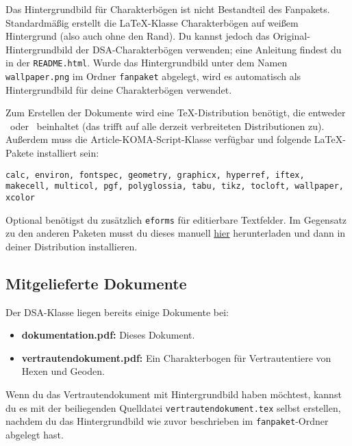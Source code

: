 \documentclass{dsa}
\begin{document}
  Das Hintergrundbild für Charakterbögen ist nicht Bestandteil des Fanpakets.
  Standardmäßig erstellt die \LaTeX-Klasse Charakterbögen auf weißem Hintergrund
  (also auch ohne den Rand). Du kannst jedoch das Original-Hintergrundbild der
  DSA-Charakterbögen verwenden; eine Anleitung findest du in der \texttt{README.html}.
  Wurde das Hintergrundbild unter dem Namen \texttt{wallpaper.png} im Ordner 
  \texttt{fanpaket} abgelegt, wird es automatisch als Hintergrundbild für deine
  Charakterbögen verwendet.
  
  Zum Erstellen der Dokumente wird eine TeX-Distribution benötigt, die entweder
  \XeLaTeX \ oder \LuaLaTeX \ beinhaltet (das trifft auf alle derzeit verbreiteten
  Distributionen zu). Außerdem muss die Article-KOMA-Script-Klasse verfügbar und
  folgende \LaTeX-Pakete installiert sein:

  \vspace{-12pt}
  \begin{flushleft}
    \texttt{calc, environ, fontspec, geometry, graphicx, hyperref, iftex, makecell,
    multicol, pgf, polyglossia, tabu, tikz, tocloft, wallpaper, xcolor}
  \end{flushleft}
  \vspace{-12pt}

  Optional benötigst du zusätzlich \texttt{eforms} für editierbare Textfelder.
  Im Gegensatz zu den anderen Paketen musst du dieses manuell
  \href{http://www.ctan.org/pkg/eforms}{hier} herunterladen und dann in deiner
  Distribution installieren.
  
  \subsection*{Mitgelieferte Dokumente}
  
  Der DSA-Klasse liegen bereits einige Dokumente bei:
  
  \begin{itemize}
    \item \textbf{dokumentation.pdf:} Dieses Dokument.
    \item \textbf{vertrautendokument.pdf:} Ein Charakterbogen für
      Vertrautentiere von Hexen und Geoden.
  \end{itemize}
  
  Wenn du das Vertrautendokument mit Hintergrundbild haben möchtest, kannst du
  es mit der beiliegenden Quelldatei \texttt{vertrautendokument.tex} selbst
  erstellen, nachdem du das Hintergrundbild wie zuvor beschrieben im
  \texttt{fanpaket}-Ordner abgelegt hast.
  
\end{document}
